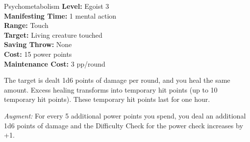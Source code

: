 {Psychometabolism}
{
	\textbf{Level:}
	Egoist 3\\
	\textbf{Manifesting Time:}
	1 mental action\\
	\textbf{Range:}
	Touch\\
	\textbf{Target:}
	Living creature touched\\
	\textbf{Saving Throw:}
	None\\
	\textbf{Cost:}
	15 power points\\
	\textbf{Maintenance Cost:}
	3 pp/round\\
}
{
	The target is dealt 1d6 points of damage per round, and you heal the same amount. Excess healing transforms into temporary hit points (up to 10 temporary hit points). These temporary hit points last for one hour.

	\textit{Augment:} For every 5 additional power points you spend, you deal an additional 1d6 points of damage and the Difficulty Check for the power check increases by +1.
}
